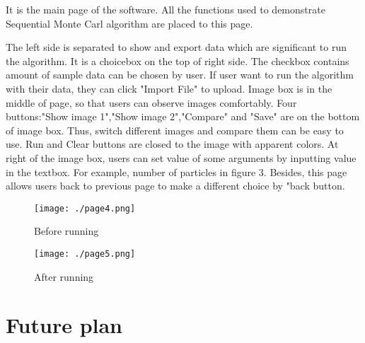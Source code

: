 \documentclass[11pt,oneside,a4paper]{article}
\begin{document}
        It is the main page of the software. All the functions used to demonstrate Sequential Monte Carl algorithm are placed to this page.

        The left side is separated to show and export data which are significant to run the algorithm. It is a choicebox on the top of right side. The checkbox contains amount of sample data can be chosen by user. If user want to run the algorithm with their data, they can click "Import File" to upload. Image box is in the middle of page, so that users can observe images comfortably. Four buttons:"Show image 1","Show image 2","Compare" and "Save" are on the bottom of image box. Thus, switch different images and compare them can be easy to use. Run and Clear buttons are closed to the image with apparent colors. At right of the image box, users can set value of some arguments by inputting value in the textbox. For example, number of particles in figure 3. Besides, this page allows users back to previous page to make a different choice by "back button.
    \begin{figure}[H]
        \centering
        \texttt{[image: ./page4.png]}
        \caption{Before running}
        \label{fig:label3}
    \end{figure}

    \begin{figure}[H]
        \centering
        \texttt{[image: ./page5.png]}
        \caption{After running}
        \label{fig:label4}
    \end{figure}
\vspace{20}
\section{Future plan}
\end{document}
